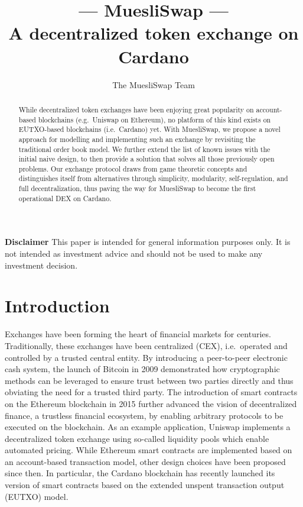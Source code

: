 \documentclass[11pt]{article}
\title{--- MuesliSwap ---\\A decentralized token exchange on Cardano}
\author{The MuesliSwap Team}
\begin{document}
\maketitle

\vspace*{2em}

\begin{abstract}
While decentralized token exchanges have been enjoying great popularity on account-based blockchains (e.g.\ Uniswap on Ethereum), no platform of this kind exists on EUTXO-based blockchains (i.e.\ Cardano) yet. With MuesliSwap, we propose a novel approach for modelling and implementing such an exchange by revisiting the traditional order book model. We further extend the list of known issues with the initial naive design, to then provide a solution that solves all those previously open problems. Our exchange protocol draws from game theoretic concepts and distinguishes itself from alternatives through simplicity, modularity, self-regulation, and full decentralization, thus paving the way for MuesliSwap to become the first operational DEX on Cardano.
\end{abstract}

\vspace*{\fill}
\textbf{Disclaimer}
This paper is intended for general information purposes only. It is not intended as investment advice and should not be used to make any investment decision.

\newpage

\section{Introduction}

Exchanges have been forming the heart of financial markets for centuries. Traditionally, these exchanges have been centralized (CEX), i.e.\ operated and controlled by a trusted central entity. By introducing a peer-to-peer electronic cash system, the launch of Bitcoin \cite{nakamoto2008bitcoin} in 2009 demonstrated how cryptographic methods can be leveraged to ensure trust between two parties directly and thus obviating the need for a trusted third party. The introduction of smart contracts on the Ethereum blockchain \cite{buterin2013ethereum} in 2015 further advanced the vision of decentralized finance, a trustless financial ecosystem, by enabling arbitrary protocols to be executed on the blockchain. As an example application, Uniswap \cite{adams2020uniswapVC} implements a decentralized token exchange using so-called liquidity pools which enable automated pricing. While Ethereum smart contracts are implemented based on an account-based transaction model, other design choices have been proposed since then. In particular, the Cardano blockchain has recently launched its version of smart contracts based on the extended unspent transaction output (EUTXO) model. \cite{chakravarty2020extended}
\end{document}

